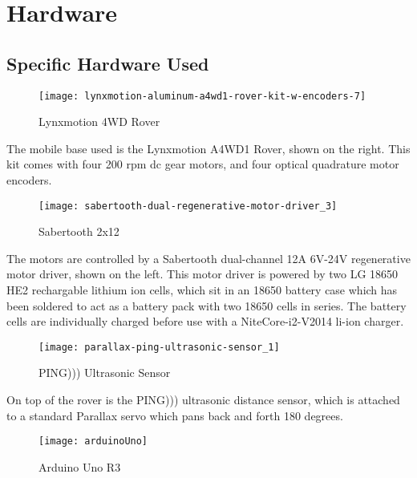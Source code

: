 \chapter{Hardware}

\section{Specific Hardware Used}

\begin{wrapfigure}{r}{0.25\textwidth} %
	\caption{Lynxmotion 4WD Rover \cite{fig_lynxmotion_rover}}
	\centering
	\texttt{[image: lynxmotion-aluminum-a4wd1-rover-kit-w-encoders-7]}
\end{wrapfigure}

The mobile base used is the Lynxmotion A4WD1 Rover, shown on the right. This kit comes with four 200 rpm dc gear motors, and four optical quadrature motor encoders.

\begin{wrapfigure}{l}{0.25\textwidth}
	\caption{Sabertooth 2x12 \cite{fig_sabertooth}}
	\centering
	\texttt{[image: sabertooth-dual-regenerative-motor-driver\_3]}
\end{wrapfigure}

The motors are controlled by a Sabertooth dual-channel 12A 6V-24V regenerative motor driver, shown on the left. This motor driver is powered by two LG 18650 HE2 rechargable lithium ion cells, which sit in an 18650 battery case which has been soldered to act as a battery pack with two 18650 cells in series. The battery cells are individually charged before use with a NiteCore-i2-V2014 li-ion charger.

\begin{wrapfigure}{r}{0.25\textwidth} %
	\caption{PING))) Ultrasonic Sensor \cite{fig_ping}}
	\centering
	\texttt{[image: parallax-ping-ultrasonic-sensor\_1]}
\end{wrapfigure}

On top of the rover is the PING))) ultrasonic distance sensor, which is attached to a standard Parallax servo which pans back and forth 180 degrees.

\begin{wrapfigure}{l}{0.25\textwidth}
	\caption{Arduino Uno R3 \cite{fig_arduino_uno}}
	\centering
	\texttt{[image: arduinoUno]}
\end{wrapfigure}

